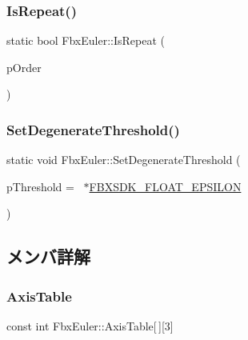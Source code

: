 \subsubsection{\texorpdfstring{Is\+Repeat()}{IsRepeat()}}
{\footnotesize\ttfamily static bool Fbx\+Euler\+::\+Is\+Repeat (\begin{DoxyParamCaption}\item[{\hyperlink{class_fbx_euler_a7d5bec7eedb022b4dae56894ab7a9939}{E\+Order}}]{p\+Order }\end{DoxyParamCaption})\hspace{0.3cm}{\ttfamily [static]}}

\mbox{\label{class_fbx_euler_aea5f70a2534b0f5353a97aec02d9bafc}} 
\subsubsection{\texorpdfstring{Set\+Degenerate\+Threshold()}{SetDegenerateThreshold()}}
{\footnotesize\ttfamily static void Fbx\+Euler\+::\+Set\+Degenerate\+Threshold (\begin{DoxyParamCaption}\item[{double}]{p\+Threshold = {~$\ast$\hyperlink{fbxtypes_8h_a11f9f828046657bad7afc23f591f2052}{F\+B\+X\+S\+D\+K\+\_\+\+F\+L\+O\+A\+T\+\_\+\+E\+P\+S\+I\+L\+ON}} }\end{DoxyParamCaption})\hspace{0.3cm}{\ttfamily [static]}}



\subsection{メンバ詳解}
\mbox{\label{class_fbx_euler_aa75edcd96f3a7432c31b09869051635d}} 
\subsubsection{\texorpdfstring{Axis\+Table}{AxisTable}}
{\footnotesize\ttfamily const int Fbx\+Euler\+::\+Axis\+Table\mbox{[}$\,$\mbox{]}\mbox{[}3\mbox{]}\hspace{0.3cm}{\ttfamily [static]}}

